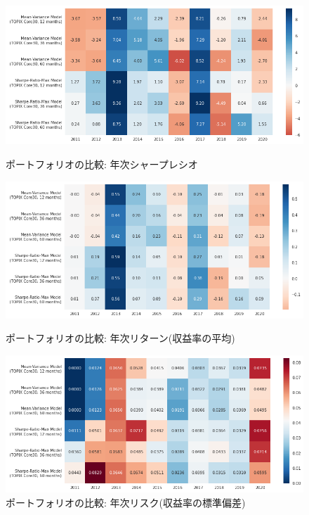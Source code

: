 \documentclass[dvipdfmx,autodetect-engine]{jsarticle}
\begin{document}
\begin{figure}[htbp]
\begin{minipage}{1.0\hsize}
    \begin{center}
        \includegraphics[width=0.75\hsize]{./figures/portfolio_sharperatio_hm.png}
        \caption{\small ポートフォリオの比較: 年次シャープレシオ}
        \label{fig:31}
    \end{center}
\end{minipage}
\begin{minipage}{1.0\hsize}
    \begin{center}
        \includegraphics[width=0.75\hsize]{./figures/portfolio_returns_hm.png}
        \caption{\small ポートフォリオの比較: 年次リターン(収益率の平均)}
        \label{fig:31}
    \end{center}
\end{minipage}
\begin{minipage}{1.0\hsize}
    \begin{center}
        \includegraphics[width=0.75\hsize]{./figures/portfolio_risk_hm.png}
        \caption{\small ポートフォリオの比較: 年次リスク(収益率の標準偏差)}
        \label{fig:31}
    \end{center}
\end{minipage}
\end{figure}
\end{document}
